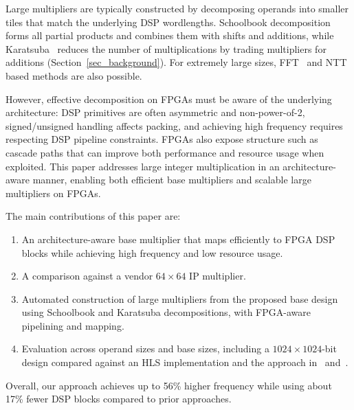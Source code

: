 Large multipliers are typically constructed by decomposing operands into smaller tiles that match the underlying DSP wordlengths.
Schoolbook decomposition forms all partial products and combines them with shifts and additions, while Karatsuba~\cite{karatsubaOriginalPaper} reduces the number of multiplications by trading multipliers for additions (Section~\ref{sec_background}).
For extremely large sizes, FFT~\cite{yapFFTquickmul2000} and NTT~\cite{weemsNTTHighPrecisionInteger2011} based methods are also possible.

However, effective decomposition on FPGAs must be aware of the underlying architecture: DSP primitives are often asymmetric and non-power-of-2, signed/unsigned handling affects packing, and achieving high frequency requires respecting DSP pipeline constraints.
FPGAs also expose structure such as cascade paths that can improve both performance and resource usage when exploited.
This paper addresses large integer multiplication in an architecture-aware manner, enabling both efficient base multipliers and scalable large multipliers on FPGAs.

The main contributions of this paper are: 
\begin{enumerate}
    \item An architecture-aware base multiplier that maps efficiently to FPGA DSP blocks while achieving high frequency and low resource usage.
    \item A comparison against a vendor $64\times64$ IP multiplier.
    \item Automated construction of large multipliers from the proposed base design using Schoolbook and Karatsuba decompositions, with FPGA-aware pipelining and mapping.
    \item Evaluation across operand sizes and base sizes, including a $1024\times1024$-bit design compared against an HLS implementation and the approach in~\cite{zhangIMpressLargeInteger2022} and~.
\end{enumerate}

Overall, our approach achieves up to 56\% higher frequency while using about 17\% fewer DSP blocks compared to prior approaches.

